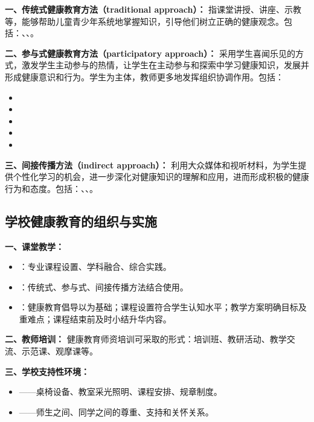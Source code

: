 \begin{keybox}
\textbf{一、传统式健康教育方法（traditional approach）：}
指课堂讲授、讲座、示教等，能够帮助儿童青少年系统地掌握知识，引导他们树立正确的健康观念。包括：、、。

\textbf{二、参与式健康教育方法（participatory approach）：}
采用学生喜闻乐见的方式，激发学生主动参与的热情，让学生在主动参与和探索中学习健康知识，发展并形成健康意识和行为。学生为主体，教师更多地发挥组织协调作用。包括：
\begin{itemize}[leftmargin=*]
    \item {}
    \item {}
    \item {}
    \item {}
    \item {}
\end{itemize}

\textbf{三、间接传播方法（indirect approach）：}
利用大众媒体和视听材料，为学生提供个性化学习的机会，进一步深化对健康知识的理解和应用，进而形成积极的健康行为和态度。包括：、、。
\end{keybox}

\subsection{学校健康教育的组织与实施}

\begin{keybox}
\textbf{一、课堂教学：}
\begin{itemize}[leftmargin=*]
    \item {}：专业课程设置、学科融合、综合实践。
    \item {}：传统式、参与式、间接传播方法结合使用。
    \item {}：健康教育倡导以为基础；课程设置符合学生认知水平；教学方案明确目标及重难点；课程结束前及时小结升华内容。
\end{itemize}

\textbf{二、教师培训：}
健康教育师资培训可采取的形式：培训班、教研活动、教学交流、示范课、观摩课等。

\textbf{三、学校支持性环境：}
\begin{itemize}[leftmargin=*]
    \item {}——桌椅设备、教室采光照明、课程安排、规章制度。
    \item {}——师生之间、同学之间的尊重、支持和关怀关系。
\end{itemize}
\end{keybox}

